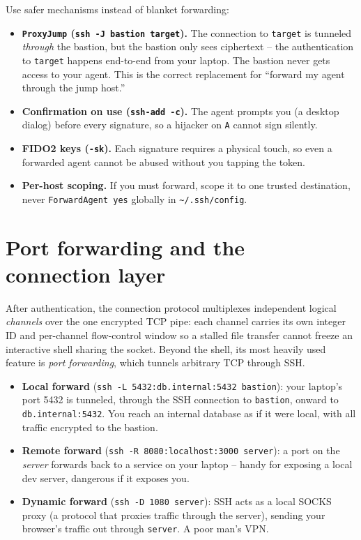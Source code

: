 \begin{whybox}
Use safer mechanisms instead of blanket forwarding:
\begin{itemize}
  \item \textbf{\texttt{ProxyJump} (\texttt{ssh -J bastion target}).} The connection to \texttt{target} is tunneled \emph{through} the bastion, but the bastion only sees ciphertext -- the authentication to \texttt{target} happens end-to-end from your laptop. The bastion never gets access to your agent. This is the correct replacement for ``forward my agent through the jump host.''
  \item \textbf{Confirmation on use (\texttt{ssh-add -c}).} The agent prompts you (a desktop dialog) before every signature, so a hijacker on \texttt{A} cannot sign silently.
  \item \textbf{FIDO2 keys (\texttt{-sk}).} Each signature requires a physical touch, so even a forwarded agent cannot be abused without you tapping the token.
  \item \textbf{Per-host scoping.} If you must forward, scope it to one trusted destination, never \texttt{ForwardAgent yes} globally in \texttt{\textasciitilde/.ssh/config}.
\end{itemize}
\end{whybox}

\section{Port forwarding and the connection layer}

After authentication, the connection protocol multiplexes independent logical \emph{channels} over the one encrypted TCP pipe: each channel carries its own integer ID and per-channel flow-control window so a stalled file transfer cannot freeze an interactive shell sharing the socket. Beyond the shell, its most heavily used feature is \emph{port forwarding}, which tunnels arbitrary TCP through SSH.

\begin{itemize}
  \item \textbf{Local forward} (\texttt{ssh -L 5432:db.internal:5432 bastion}): your laptop's port 5432 is tunneled, through the SSH connection to \texttt{bastion}, onward to \texttt{db.internal:5432}. You reach an internal database as if it were local, with all traffic encrypted to the bastion.
  \item \textbf{Remote forward} (\texttt{ssh -R 8080:localhost:3000 server}): a port on the \emph{server} forwards back to a service on your laptop -- handy for exposing a local dev server, dangerous if it exposes you.
  \item \textbf{Dynamic forward} (\texttt{ssh -D 1080 server}): SSH acts as a local SOCKS proxy (a protocol that proxies traffic through the server), sending your browser's traffic out through \texttt{server}. A poor man's VPN.
\end{itemize}

